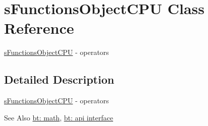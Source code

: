 \hypertarget{structs_functions_object_c_p_u}{\section{s\-Functions\-Object\-C\-P\-U Class Reference}
\label{structs_functions_object_c_p_u}
}


\hyperlink{structs_functions_object_c_p_u}{s\-Functions\-Object\-C\-P\-U} -\/ operators  




\subsection{Detailed Description}
\hyperlink{structs_functions_object_c_p_u}{s\-Functions\-Object\-C\-P\-U} -\/ operators 

\begin{DoxySeeAlso}{See Also}
\hyperlink{group__math}{bt\-: math}, \hyperlink{group__apiinterface}{bt\-: api interface} 
\end{DoxySeeAlso}
